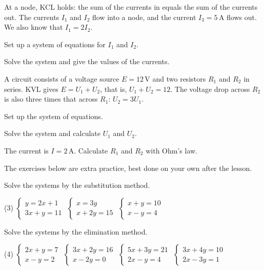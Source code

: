 At a node, KCL holds: the sum of the currents in equals the sum of the currents out. The currents
$I_1$ and $I_2$ flow into a node, and the current $I_3 = 5\,\text{A}$ flows out. We also know that
$I_1 = 2 I_2$.
\begin{parts}
  \item Set up a system of equations for $I_1$ and $I_2$.
  \item Solve the system and give the values of the currents.
\end{parts}

A circuit consists of a voltage source $E = 12\,\text{V}$ and two resistors $R_1$ and $R_2$ in
series. KVL gives $E = U_1 + U_2$, that is, $U_1 + U_2 = 12$. The voltage drop across $R_2$ is
also three times that across $R_1$: $U_2 = 3 U_1$.
\begin{parts}
  \item Set up the system of equations.
  \item Solve the system and calculate $U_1$ and $U_2$.
  \item The current is $I = 2\,\text{A}$. Calculate $R_1$ and $R_2$ with Ohm's law.
\end{parts}

The exercises below are extra practice, best done on your own after the lesson.

Solve the systems by the substitution method.
\begin{delar}(3)
  \task $\begin{cases} y = 2x + 1 \\ 3x + y = 11 \end{cases}$
  \task $\begin{cases} x = 3y \\ x + 2y = 15 \end{cases}$
  \task $\begin{cases} x + y = 10 \\ x - y = 4 \end{cases}$
\end{delar}

Solve the systems by the elimination method.
\begin{delar}(4)
  \task $\begin{cases} 2x + y = 7 \\ x - y = 2 \end{cases}$
  \task $\begin{cases} 3x + 2y = 16 \\ x - 2y = 0 \end{cases}$
  \task $\begin{cases} 5x + 3y = 21 \\ 2x - y = 4 \end{cases}$
  \task $\begin{cases} 3x + 4y = 10 \\ 2x - 3y = 1 \end{cases}$
\end{delar}

